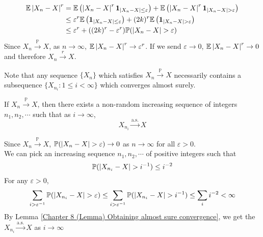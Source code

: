 \documentclass{huhtakm-template-book}
\newcommand{\prob}{\mathbb{P}}
\newcommand{\expect}{\mathbb{E}}
\begin{document}
\begin{proofing}
\begin{enumerate}
\begin{align*}
			\expect\abs{X_{n}-X}^{r}&=\expect\left(\abs{X_{n}-X}^{r}\mathbf{1}_{\abs{X_{n}-X}\leq\varepsilon}\right)+\expect\left(\abs{X_{n}-X}^{r}\mathbf{1}_{\abs{X_{n}-X}>\varepsilon}\right)\\
			&\leq\varepsilon^{r}\expect\left(\mathbf{1}_{\abs{X_{n}-X}\leq\varepsilon}\right)+(2k)^{r}\expect\left(\mathbf{1}_{\abs{X_{n}-X}>\varepsilon}\right)\\
			&\leq\varepsilon^{r}+((2k)^{r}-\varepsilon^{r})\prob(\abs{X_{n}-X}>\varepsilon)
		\end{align*}
		Since $X_{n}\xrightarrow{\prob}X$, as $n\to\infty$, $\expect\abs{X_{n}-X}^{r}\to\varepsilon^{r}$. If we send $\varepsilon\to 0$, $\expect\abs{X_{n}-X}^{r}\to 0$ and therefore $X_{n}\xrightarrow{r}X$.
	\end{enumerate}
\end{proofing}
Note that any sequence $\{X_{n}\}$ which satisfies $X_{n}\xrightarrow{\prob}X$ necessarily contains a subsequence $\{X_{n_{i}}:1\leq i<\infty\}$ which converges almost surely.
\begin{thm}
	If $X_{n}\xrightarrow{\prob}X$, then there exists a non-random increasing sequence of integers $n_{1},n_{2},\cdots$ such that as $i\to\infty$,
	\begin{equation*}
		X_{n_{i}}\xrightarrow{\text{a.s.}}X
	\end{equation*}
\end{thm}
\begin{proofing}
	Since $X_{n}\xrightarrow{\prob}X$, $\prob(\abs{X_{n}-X}>\varepsilon)\to 0$ as $n\to\infty$ for all $\varepsilon>0$.\\
	We can pick an increasing sequence $n_{1},n_{2},\cdots$ of positive integers such that
	\begin{equation*}
		\prob(\abs{X_{n_{i}}-X}>i^{-1})\leq i^{-2}
	\end{equation*}
	For any $\varepsilon>0$,
	\begin{equation*}
		\sum_{i>\varepsilon^{-1}}\prob(\abs{X_{n_{i}}-X}>\varepsilon)\leq\sum_{i>\varepsilon^{-1}}\prob(\abs{X_{n_{i}}-X}>i^{-1})\leq\sum_{i}i^{-2}<\infty
	\end{equation*}
	By Lemma \ref{Chapter 8 (Lemma) Obtaining almost sure convergence}, we get the $X_{n_{i}}\xrightarrow{\text{a.s.}}X$ as $i\to\infty$
\end{proofing}
\end{document}
